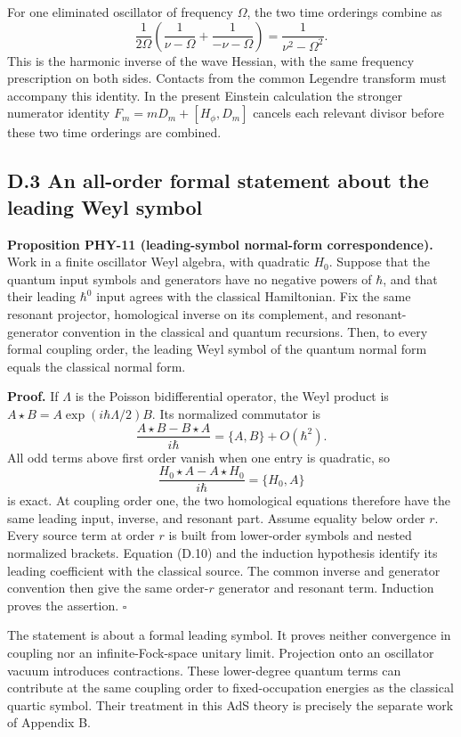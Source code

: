 For one eliminated oscillator of frequency \(\Omega\), the two time orderings combine as \[
\frac1{2\Omega}
\left(\frac1{\nu-\Omega}+\frac1{-\nu-\Omega}\right)
=\frac1{\nu^2-\Omega^2}.
\tag{D.9}
\] This is the harmonic inverse of the wave Hessian, with the same frequency prescription on both sides. Contacts from the common Legendre transform must accompany this identity. In the present Einstein calculation the stronger numerator identity \(F_m=mD_m+[H_\phi,D_m]\) cancels each relevant divisor before these two time orderings are combined.

\hypertarget{d.3-an-all-order-formal-statement-about-the-leading-weyl-symbol}{%
\subsection{D.3 An all-order formal statement about the leading Weyl symbol}\label{d.3-an-all-order-formal-statement-about-the-leading-weyl-symbol}}

\textbf{Proposition PHY-11 (leading-symbol normal-form correspondence).} Work in a finite oscillator Weyl algebra, with quadratic \(H_0\). Suppose that the quantum input symbols and generators have no negative powers of \(\hbar\), and that their leading \(\hbar^0\) input agrees with the classical Hamiltonian. Fix the same resonant projector, homological inverse on its complement, and resonant-generator convention in the classical and quantum recursions. Then, to every formal coupling order, the leading Weyl symbol of the quantum normal form equals the classical normal form.

\textbf{Proof.} If \(\Lambda\) is the Poisson bidifferential operator, the Weyl product is \(A\star B=A\exp(i\hbar\Lambda/2)B\). Its normalized commutator is \[
\frac{A\star B-B\star A}{i\hbar}
=\{A,B\}+O(\hbar^2).
\tag{D.10}
\] All odd terms above first order vanish when one entry is quadratic, so \[
\frac{H_0\star A-A\star H_0}{i\hbar}
=\{H_0,A\}
\tag{D.11}
\] is exact. At coupling order one, the two homological equations therefore have the same leading input, inverse, and resonant part. Assume equality below order \(r\). Every source term at order \(r\) is built from lower-order symbols and nested normalized brackets. Equation (D.10) and the induction hypothesis identify its leading coefficient with the classical source. The common inverse and generator convention then give the same order-\(r\) generator and resonant term. Induction proves the assertion. \(\square\)

The statement is about a formal leading symbol. It proves neither convergence in coupling nor an infinite-Fock-space unitary limit. Projection onto an oscillator vacuum introduces contractions. These lower-degree quantum terms can contribute at the same coupling order to fixed-occupation energies as the classical quartic symbol. Their treatment in this AdS theory is precisely the separate work of Appendix B.

